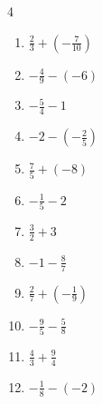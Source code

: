 \begin{multicols}{4}
\begin{enumerate}
  \item $\displaystyle \frac{2}{3} + \left(-\frac{7}{10}\right)$


  \item $\displaystyle -\frac{4}{9} - \left(-6\right)$


  \item $\displaystyle -\frac{5}{4} - 1$


  \item $\displaystyle -2 - \left(-\frac{2}{5}\right)$


  \item $\displaystyle \frac{7}{5} + \left(-8\right)$


\columnbreak %

  \item $\displaystyle -\frac{1}{5} - 2$


  \item $\displaystyle \frac{3}{2} + 3$


  \item $\displaystyle -1 - \frac{8}{7}$


  \item $\displaystyle \frac{2}{7} + \left(-\frac{1}{9}\right)$


  \item $\displaystyle -\frac{9}{5} - \frac{5}{8}$


  \item $\displaystyle \frac{4}{3} + \frac{9}{4}$


  \item $\displaystyle -\frac{1}{8} - \left(-2\right)$


\end{enumerate}
\end{multicols}
